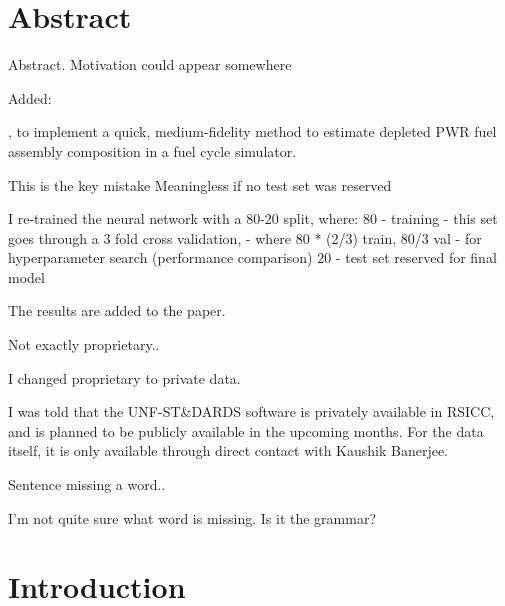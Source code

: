 \documentclass[answers,11pt]{exam}
\begin{document}
\section*{Abstract}
\begin{questions}

        \question Abstract. Motivation could appear somewhere

        \begin{solution}
        	Added:
            
            , to implement a quick, medium-fidelity method to
            estimate depleted \gls{PWR} fuel assembly composition in a fuel
            cycle simulator.
        \end{solution}

        \question
        This is the key mistake Meaningless if no test set was reserved

        \begin{solution}
         I re-trained the neural network with a 80-20 split, where:
         80 - training
            - this set goes through a 3 fold cross validation,
            - where 80 * (2/3) train, 80/3 val
            - for hyperparameter search (performance comparison)
         20 - test set reserved for final model

         The results are added to the paper. 

        \end{solution}

        \quesiton
        Not exactly proprietary..

        \begin{solution}
        I changed proprietary to private data.

        I was told that the UNF-ST\&DARDS software is privately available
        in RSICC, and is planned to be publicly available in the upcoming
        months. For the data itself, it is only available through direct
        contact with Kaushik Banerjee.
        \end{solution}

        \question
        Sentence missing a word..


        \begin{solution}
        I'm not quite sure what word is missing. Is it the grammar?
        \end{solution}

\section*{Introduction}


\end{questions}
\end{document}
